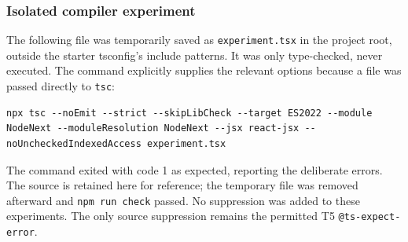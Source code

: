\documentclass[
  11pt,
]{article}
\newcommand{\passthrough}[1]{#1}
\begin{document}
\subsubsection{Isolated compiler
experiment}\label{isolated-compiler-experiment}

The following file was temporarily saved as
\passthrough{\lstinline!experiment.tsx!} in the project root, outside
the starter tsconfig's include patterns. It was only type-checked, never
executed. The command explicitly supplies the relevant options because a
file was passed directly to \passthrough{\lstinline!tsc!}:

\begin{lstlisting}
npx tsc --noEmit --strict --skipLibCheck --target ES2022 --module NodeNext --moduleResolution NodeNext --jsx react-jsx --noUncheckedIndexedAccess experiment.tsx
\end{lstlisting}

The command exited with code 1 as expected, reporting the deliberate
errors. The source is retained here for reference; the temporary file
was removed afterward and \passthrough{\lstinline!npm run check!}
passed. No suppression was added to these experiments. The only source
suppression remains the permitted T5
\passthrough{\lstinline!@ts-expect-error!}.
\end{document}
